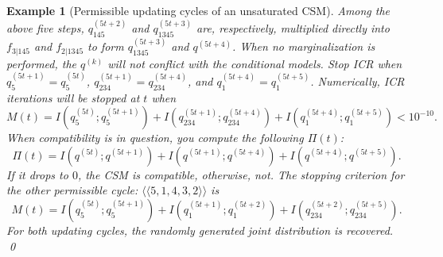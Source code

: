 \documentclass[12pt,a4paper]{article}
\newtheorem{example}{Example}
\begin{document}
\begin{example}[Permissible updating cycles of an unsaturated CSM]
Among the above five steps, $q^{(5t+2)}_{145}$ and $q^{(5t+3)}_{1345}$ are,
respectively, multiplied directly into
$f_{3|145}$ and $f_{2|1345}$ to form $q_{1345}^{(5t+3)}$ and $q^{(5t+4)}$.
When no marginalization is performed, the $q^{(k)}$
 will not conflict with the conditional models.
Stop ICR when $q^{(5t+1)}_5 =q^{(5t)}_5$, $q^{(5t+1)}_{234} =q^{(5t+4)}_{234}$, and  $q^{(5t+4)}_1 =q^{(5t+5)}_1$.
Numerically,  ICR iterations will be stopped at $t$ when
\[M(t)=I(q_5^{(5t)};q_5^{(5t+1)})+I(q_{234}^{(5t+1)};q_{234}^{(5t+4)})+I(q_1^{(5t+4)};q_1^{(5t+5)}) < 10^{-10}.\]
When  compatibility is in question, you compute the following $\Pi(t)$:
\[\Pi(t)=I(q^{(5t)};q^{(5t+1)})+I(q^{(5t+1)};q^{(5t+4)})+I(q^{(5t+4)};q^{(5t+5)}).\]
If it drops to $0$, the CSM is compatible, otherwise, not.
The stopping criterion for the other permissible cycle: $\langle \langle 5,1,4,3,2\rangle \rangle$ is
\[M(t)=I(q_5^{(5t)};q_5^{(5t+1)})+I(q_1^{(5t+1)};q_1^{(5t+2)})+I(q_{234}^{(5t+2)};q_{234}^{(5t+5)}).\]
For both updating cycles, the randomly generated joint distribution is recovered.
\qed
\end{example}
\end{document}
